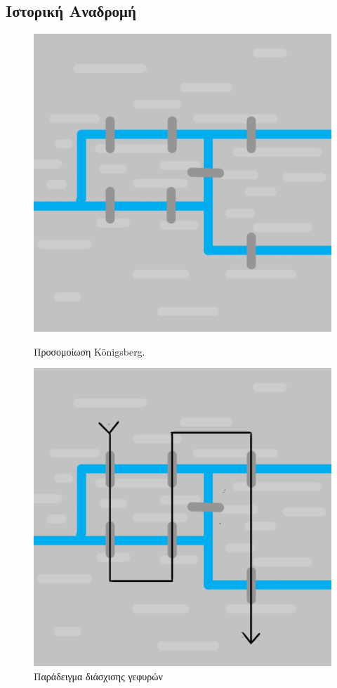 \subsection{Ιστορική Αναδρομή}
\begin{figure}[ht]
    \begin{minipage}[c]{.46\linewidth}
        \centering
        \includegraphics[scale=0.15]{2947_thesis/pictures/konigsberg.png}
        \caption{Προσομοίωση Königsberg.}
        \label{1}
    \end{minipage}
    \hfill%
    \begin{minipage}[c]{.46\linewidth}
        \centering
        \includegraphics[scale=0.15]{2947_thesis/pictures/konigsbergEx.png} 
        \caption{Παράδειγμα διάσχισης γεφυρών}
        \label{2}
    \end{minipage}
\end{figure}
